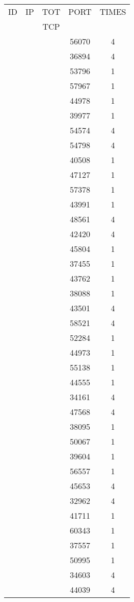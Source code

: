 \documentclass[a4paper]{scrartcl}
\begin{document}
\begin{minipage}[b]{0.5\linewidth}
\begin{tabular}{| c | c | c | c | c |}
\hline
ID & IP & TOT & PORT & TIMES \\ 
   &    & TCP &      &       \\ 
\hline
& & & 56070 & 4 \\ & & & 36894 & 4 \\ & & & 53796 & 1 \\ & & & 57967 & 1 \\ & & & 44978 & 1 \\ & & & 39977 & 1 \\ & & & 54574 & 4 \\ & & & 54798 & 4 \\ & & & 40508 & 1 \\ & & & 47127 & 1 \\ & & & 57378 & 1 \\ & & & 43991 & 1 \\ & & & 48561 & 4 \\ & & & 42420 & 4 \\ & & & 45804 & 1 \\ & & & 37455 & 1 \\ & & & 43762 & 1 \\ & & & 38088 & 1 \\ & & & 43501 & 4 \\ & & & 58521 & 4 \\ & & & 52284 & 1 \\ & & & 44973 & 1 \\ & & & 55138 & 1 \\ & & & 44555 & 1 \\ & & & 34161 & 4 \\ & & & 47568 & 4 \\ & & & 38095 & 1 \\ & & & 50067 & 1 \\ & & & 39604 & 1 \\ & & & 56557 & 1 \\ & & & 45653 & 4 \\ & & & 32962 & 4 \\ & & & 41711 & 1 \\ & & & 60343 & 1 \\ & & & 37557 & 1 \\ & & & 50995 & 1 \\ & & & 34603 & 4 \\ & & & 44039 & 4 \\ \hline
\end{tabular}
\end{minipage}\hfill
\end{document}
